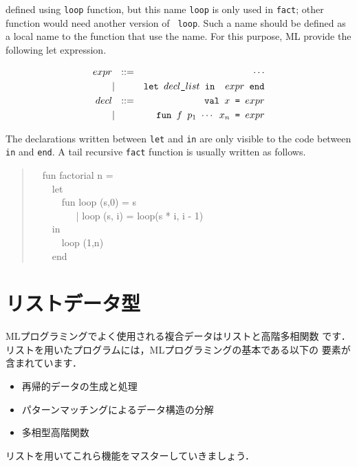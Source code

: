 \documentclass{jbook}
\newif\ifjp
\newcommand{\txt}[2]{#1}
\newcommand{\myem}{\mbox{\ \ }}
\newcommand{\myfm}{\mbox{ \ \ }}
\begin{document}
defined using {\tt loop} function, but this name {\tt loop} is only
used in {\tt fact}; other function would need another version of {\tt
loop}.
	Such a name should be defined as a local name to the function
that use the name.
	For this purpose, ML provide the following let expression.
\begin{tt}
\begin{eqnarray*}
expr &\mbox{\ \ }::=& \cdots \\
     &|& \mbox{\tt let\ $decl\_list$\ in \ $expr$\ end}
\\
decl &\mbox{\ \ }::=& \mbox{\tt val\ $x$ = $expr$}
\\
     &|& \mbox{\tt fun\ $f$\ $p_1$ $\cdots$ $x_n$ =  $expr$}
\end{eqnarray*}
\end{tt}
	The declarations written between 
{\tt let} and {\tt in} are only visible to the code between {\tt in} and
{\tt end}.
	A tail recursive {\tt fact} function is usually written as follows.
\begin{tt}
\begin{quote}
\myem  fun factorial n =
\\\myem\myem    let
\\\myem\myem\myem      fun loop (s,0) = s
\\\myem\myem\myem\myfm        | loop (s, i) = loop(s * i, i - 1)
\\\myem\myem    in
\\\myem\myem\myem      loop (1,n)
\\\myem\myem    end
\end{quote}
\end{tt}
\fi%

\section{\txt{リストデータ型}{List data type}}
\label{sec:tutorialList}

\ifjp%
	MLプログラミングでよく使用される複合データはリストと高階多相関数
です．
	リストを用いたプログラムには，MLプログラミングの基本である以下の
要素が含まれています．
\begin{itemize}
\item 
再帰的データの生成と処理
\item 
パターンマッチングによるデータ構造の分解
\item 
多相型高階関数
\end{itemize}
	リストを用いてこれら機能をマスターしていきましょう．
\end{document}
